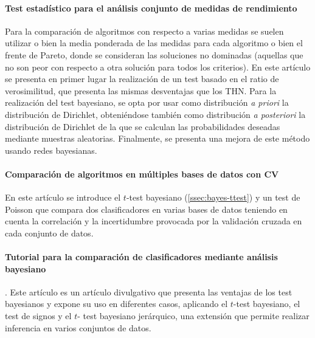 \paragraph{Test estadístico para el análisis conjunto de 
medidas de rendimiento} \cite{BENAVOLI15b}	Para la 
comparación de algoritmos con respecto a varias medidas
se suelen utilizar o bien la media ponderada de las medidas
para cada algoritmo o bien el frente de Pareto, donde se 
consideran las soluciones no dominadas (aquellas que no son
peor con respecto a otra solución para todos los criterios).
En este artículo se presenta en primer lugar la realización 
de un test basado en el ratio de verosimilitud, que presenta
las mismas desventajas que los THN. Para la realización del
test bayesiano, se opta por usar como distribución 
\textit{a priori} la distribución de Dirichlet, obteniéndose
también como distribución \textit{a posteriori} la 
distribución de Dirichlet de la que se calculan las 
probabilidades deseadas mediante muestras aleatorias.
Finalmente, se presenta una mejora de este método usando
redes bayesianas.

\paragraph{Comparación de algoritmos en múltiples bases de 
datos con CV} \cite{CORANI15} En este artículo se introduce
el $t$-test bayesiano (\ref{ssec:bayes-ttest}) y un test de 
Poisson que compara dos clasificadores en varias bases de 
datos teniendo en cuenta la correlación y la incertidumbre 
provocada por la validación cruzada en cada conjunto de 
datos.

\paragraph{Tutorial para la comparación de clasificadores 
mediante análisis bayesiano}. \cite{BENAVOLI16} Este artículo 
es un artículo divulgativo que presenta las ventajas de los 
test bayesianos y expone su uso en diferentes casos, 
aplicando el $t$-test bayesiano, el test de signos y el $t$-
test bayesiano jerárquico, una extensión que permite realizar 
inferencia en varios conjuntos de datos.










